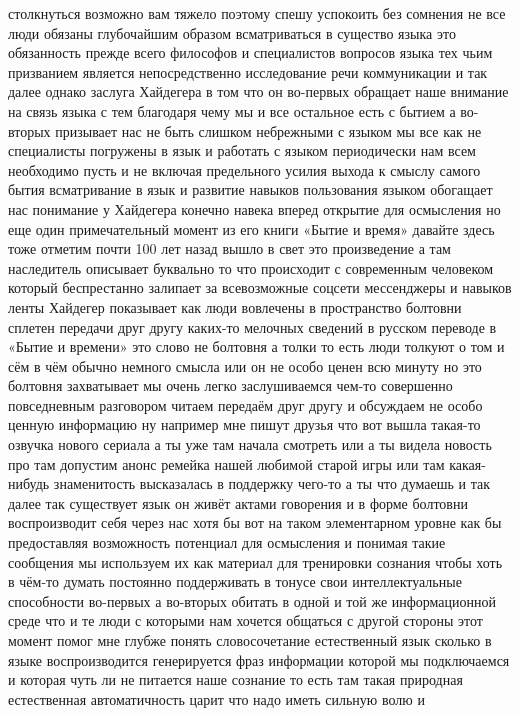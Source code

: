столкнуться возможно вам тяжело поэтому спешу успокоить без сомнения не все люди
обязаны глубочайшим образом всматриваться в существо языка это обязанность
прежде всего философов и специалистов вопросов языка тех чьим призванием
является непосредственно исследование речи коммуникации и так далее однако
заслуга Хайдегера в том что он во-первых обращает наше внимание на связь языка с
тем благодаря чему мы и все остальное есть с бытием а во-вторых призывает нас не
быть слишком небрежными с языком мы все как не специалисты погружены в язык и
работать с языком периодически нам всем необходимо пусть и не включая
предельного усилия выхода к смыслу самого бытия всматривание в язык и развитие
навыков пользования языком обогащает нас понимание у Хайдегера конечно навека
вперед открытие для осмысления но еще один примечательный момент из его книги
«Бытие и время» давайте здесь тоже отметим почти 100 лет назад вышло в свет это
произведение а там наследитель описывает буквально то что происходит с
современным человеком который беспрестанно залипает за всевозможные соцсети
мессенджеры и навыков ленты Хайдегер показывает как люди вовлечены в
пространство болтовни сплетен передачи друг другу каких-то мелочных сведений в
русском переводе в «Бытие и времени» это слово не болтовня а толки то есть люди
толкуют о том и сём в чём обычно немного смысла или он не особо ценен всю минуту
но это болтовня захватывает мы очень легко заслушиваемся чем-то совершенно
повседневным разговором читаем передаём друг другу и обсуждаем не особо ценную
информацию ну например мне пишут друзья что вот вышла такая-то озвучка нового
сериала а ты уже там начала смотреть или а ты видела новость про там допустим
анонс ремейка нашей любимой старой игры или там какая-нибудь знаменитость
высказалась в поддержку чего-то а ты что думаешь и так далее так существует язык
он живёт актами говорения и в форме болтовни воспроизводит себя через нас хотя
бы вот на таком элементарном уровне как бы предоставляя возможность потенциал
для осмысления и понимая такие сообщения мы используем их как материал для
тренировки сознания чтобы хоть в чём-то думать постоянно поддерживать в тонусе
свои интеллектуальные способности во-первых а во-вторых обитать в одной и той же
информационной среде что и те люди с которыми нам хочется общаться с другой
стороны этот момент помог мне глубже понять словосочетание естественный язык
сколько в языке воспроизводится генерируется фраз информации которой мы
подключаемся и которая чуть ли не питается наше сознание то есть там такая
природная естественная автоматичность царит что надо иметь сильную волю и
